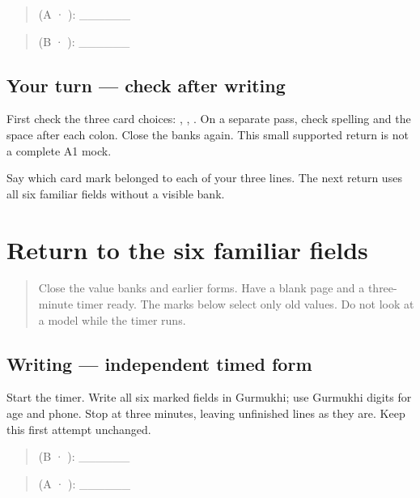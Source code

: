 \begin{quote}
 (A · ): \_\_\_\_\_\_
\end{quote}

\begin{quote}
 (B · ): \_\_\_\_\_\_
\end{quote}

\subsection*{Your turn — check after writing}
First check the three card choices: \textbf{}, \textbf{}, \textbf{}. On a separate pass, check spelling and the space after each colon. Close the banks again. This small supported return is not a complete A1 mock.

\begin{tcolorbox}[breakable,colback=teal!4,colframe=teal!35!black,title={Before you move on}]
Say which card mark belonged to each of your three lines. The next return uses all six familiar fields without a visible bank.
\end{tcolorbox}
\section[\texorpdfstring{\pa{ਨਾਂ}: · \pa{ਭਾਸ਼ਾ} … (return to a …)}{ਨਾਂ: · ਭਾਸ਼ਾ … (return to a …)}]{Return to the six familiar fields}

\label{lesson:PA-W16-form-timed-return}



\begin{quote}
Close the value banks and earlier forms. Have a blank page and a three-minute timer ready. The marks below select only old values. Do not look at a model while the timer runs.
\end{quote}

\subsection*{Writing — independent timed form}
Start the timer. Write all six marked fields in Gurmukhi; use Gurmukhi digits for age and phone. Stop at three minutes, leaving unfinished lines as they are. Keep this first attempt unchanged.

\begin{quote}
 (B · ): \_\_\_\_\_\_
\end{quote}

\begin{quote}
 (A · ): \_\_\_\_\_\_
\end{quote}


